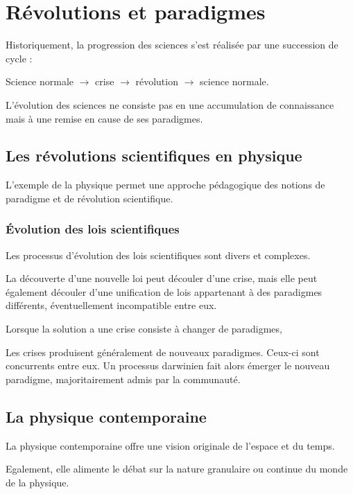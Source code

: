 
\section{Révolutions et paradigmes}

Historiquement, la progression des sciences s'est réalisée par une succession de cycle :

\begin{center}
Science normale $\to$ crise $\to$ révolution $\to$ science normale.
\end{center}

L'évolution des sciences ne consiste pas en une accumulation de connaissance mais à une remise en cause de ses paradigmes.

\subsection{Les révolutions scientifiques en physique}

L'exemple de la physique permet une approche pédagogique des notions de paradigme et de révolution scientifique.

  \subsubsection{Évolution des lois scientifiques}

Les processus d'évolution des lois scientifiques sont divers et complexes.

La découverte d'une nouvelle loi peut découler d'une crise, mais elle peut également découler d'une unification de lois appartenant à des paradigmes différents, éventuellement incompatible entre eux.

Lorsque la solution a une crise consiste à changer de paradigmes, 

 Les crises produisent généralement de nouveaux paradigmes. Ceux-ci sont concurrents entre eux. Un processus darwinien fait alors émerger le nouveau paradigme, majoritairement admis par la communauté.


\subsection{La physique contemporaine}

La physique contemporaine offre une vision originale de l'espace et du temps.

Egalement, elle alimente le débat sur la nature granulaire ou continue du monde de la physique.

